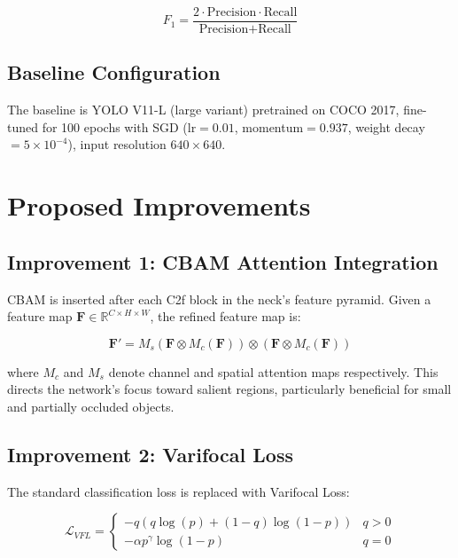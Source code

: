 \documentclass[12pt, a4paper]{report}
\begin{document}
\begin{equation}
  F_1 = \frac{2 \cdot \text{Precision} \cdot \text{Recall}}
             {\text{Precision} + \text{Recall}}
  \label{eq:f1}
\end{equation}

\section{Baseline Configuration}

The baseline is YOLO V11-L (large variant) pretrained on COCO 2017, 
fine-tuned for 100 epochs with SGD ($\text{lr}=0.01$, momentum$=0.937$, 
weight decay$=5\times10^{-4}$), input resolution $640 \times 640$.

\chapter{Proposed Improvements}
\label{chap:improvements}

\section{Improvement 1: CBAM Attention Integration}

CBAM is inserted after each C2f block in the neck's feature pyramid. 
Given a feature map $\mathbf{F} \in \mathbb{R}^{C \times H \times W}$, 
the refined feature map is:

\begin{equation}
  \mathbf{F'} = M_s(\mathbf{F} \otimes M_c(\mathbf{F})) \otimes 
                (\mathbf{F} \otimes M_c(\mathbf{F}))
  \label{eq:cbam}
\end{equation}

where $M_c$ and $M_s$ denote channel and spatial attention maps respectively. 
This directs the network's focus toward salient regions, particularly 
beneficial for small and partially occluded objects.

\section{Improvement 2: Varifocal Loss}

The standard classification loss is replaced with Varifocal Loss:

\begin{equation}
  \mathcal{L}_{VFL} = 
  \begin{cases}
    -q(q\log(p) + (1-q)\log(1-p)) & q > 0 \\
    -\alpha p^\gamma \log(1-p)    & q = 0
  \end{cases}
  \label{eq:vfl}
\end{equation}
\end{document}
